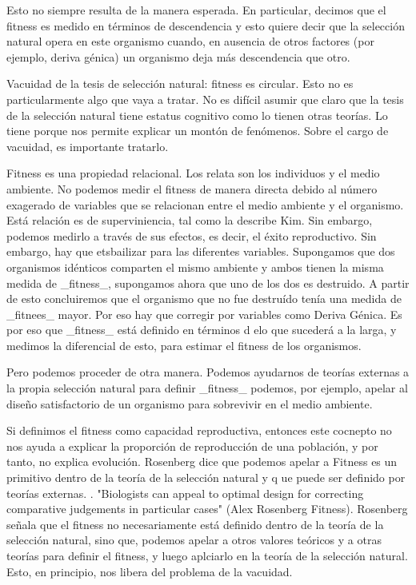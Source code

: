 Esto no siempre resulta de la manera esperada. En particular, decimos que el fitness es medido en términos de descendencia y esto quiere decir que la selección natural opera en este organismo cuando, en ausencia de otros factores (por ejemplo, deriva génica) un organismo deja más descendencia que otro.

Vacuidad  de la tesis de selección natural: fitness es circular. Esto no es particularmente algo que vaya a tratar. No es difícil asumir que claro que la tesis de la selección natural tiene estatus cognitivo como lo tienen otras teorías. Lo tiene porque nos permite explicar un montón de fenómenos. Sobre el cargo de vacuidad, es importante tratarlo.

Fitness es una propiedad relacional. Los relata son los individuos y el medio ambiente. No podemos medir el fitness de manera directa debido al número exagerado de variables que se relacionan entre el medio ambiente y el organismo. Está relación es de superviniencia, tal como la describe Kim. Sin embargo, podemos medirlo a través de sus efectos, es decir, el éxito reproductivo. Sin embargo, hay que etsbailizar para las diferentes variables. Supongamos que dos organismos idénticos comparten el mismo ambiente y ambos tienen la misma medida de _fitness_, supongamos ahora que uno de los dos es destruido. A partir de esto concluiremos que el organismo que no fue destruído tenía una medida de _fitnees_ mayor. Por eso hay que corregir por variables como Deriva Génica. Es por eso que _fitness_ está definido en términos d elo que sucederá a la larga, y medimos la diferencial de esto, para estimar el fitness de los organismos.

Pero podemos proceder de otra manera. Podemos ayudarnos de teorías externas a la propia selección natural para definir _fitness_ podemos, por ejemplo, apelar al diseño satisfactorio de un organismo para sobrevivir en el medio ambiente.

Si definimos el fitness como capacidad reproductiva, entonces este cocnepto no nos ayuda a explicar la proporción de reproducción de una población, y por tanto, no explica evolución. Rosenberg dice que podemos apelar a Fitness es un primitivo dentro de la teoría de la selección natural y q  ue puede ser definido por teorías externas. . "Biologists can appeal to optimal design for correcting comparative judgements in particular cases" (Alex Rosenberg Fitness). Rosenberg señala que el fitness no necesariamente está definido dentro de la teoría de la selección natural, sino que, podemos apelar a otros valores teóricos y a otras teorías para definir el fitness, y luego aplciarlo en la teoría de la selección natural. Esto, en principio, nos libera del problema de la vacuidad.

